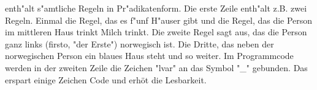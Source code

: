 enth"alt s"amtliche Regeln in Pr"adikatenform. Die erste Zeile enth"alt z.B. zwei Regeln. Einmal die Regel, das es f"unf H"auser gibt und die Regel, das die Person im mittleren Haus trinkt Milch trinkt. Die zweite Regel sagt aus, das die Person ganz links (firsto, "der Erste") norwegisch ist. Die Dritte, das neben der norwegischen Person ein blaues Haus steht und so weiter.
Im Programmcode werden in der zweiten Zeile die Zeichen "lvar" an das Symbol "_" gebunden. Das erspart einige Zeichen Code und erhöt die Lesbarkeit.
